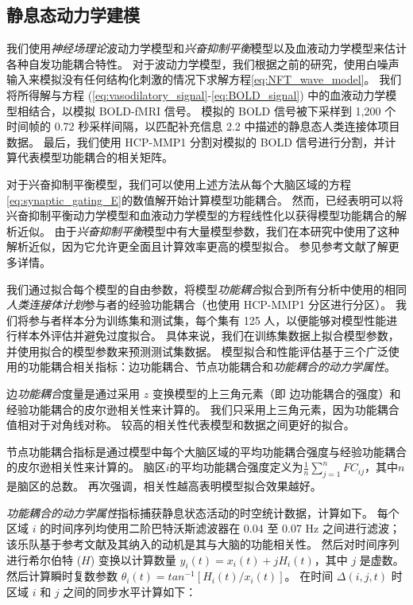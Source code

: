 \documentclass[lang=cn,a4paper,newtx]{elegantpaper}
\begin{document}
\subsection{静息态动力学建模} \label{sec:modelling_resting}

我们使用\textit{神经场理论}波动力学模型和\textit{兴奋抑制平衡}模型以及血液动力学模型来估计各种自发功能耦合特性。
对于波动力学模型，我们根据之前的研究\cite{robinson2005multiscale,sanz2018nftsim}，使用白噪声输入来模拟没有任何结构化刺激的情况下求解方程\ref{eq:NFT_wave_model}。
我们将所得解与方程 (\ref{eq:vasodilatory_signal}-\ref{eq:BOLD_signal}) 中的血液动力学模型相结合，以模拟 BOLD-fMRI 信号。
模拟的 BOLD 信号被下采样到 1,200 个时间帧的 0.72 秒采样间隔，以匹配补充信息 2.2 中描述的静息态人类连接体项目数据。
最后，我们使用 HCP-MMP1 分割对模拟的 BOLD 信号进行分割，并计算代表模型功能耦合的相关矩阵。


对于兴奋抑制平衡模型，我们可以使用上述方法从每个大脑区域的方程\ref{eq:synaptic_gating_E}的数值解开始计算模型功能耦合。
然而，已经表明可以将兴奋抑制平衡动力学模型和血液动力学模型的方程线性化以获得模型功能耦合\cite{demirtacs2019hierarchical}的解析近似。
由于\textit{兴奋抑制平衡}模型中有大量模型参数，我们在本研究中使用了这种解析近似，因为它允许更全面且计算效率更高的模型拟合。
参见参考文献\cite{demirtacs2019hierarchical}了解更多详情。


我们通过拟合每个模型的自由参数，将模型\textit{功能耦合}拟合到所有分析中使用的相同\textit{人类连接体计划}参与者的经验功能耦合（也使用 HCP-MMP1 分区进行分区）。
我们将参与者样本分为训练集和测试集，每个集有 125 人，以便能够对模型性能进行样本外评估并避免过度拟合。
具体来说，我们在训练集数据上拟合模型参数，并使用拟合的模型参数来预测测试集数据。
模型拟合和性能评估基于三个广泛使用的功能耦合相关指标\cite{deco2021dynamical,aquino2022intersection}：边功能耦合、节点功能耦合和\textit{功能耦合的动力学属性}。


边\textit{功能耦合}度量是通过采用 $ z $ 变换模型的上三角元素（即 边功能耦合的强度）和经验功能耦合的皮尔逊相关性来计算的。
我们只采用上三角元素，因为功能耦合值相对于对角线对称。
较高的相关性代表模型和数据之间更好的拟合。


节点功能耦合指标是通过模型中每个大脑区域的平均功能耦合强度与经验功能耦合的皮尔逊相关性来计算的。
脑区$ i $的平均功能耦合强度定义为$ \frac{1}{n} \sum_{j=1}^{n} FC_{ij} $，其中$ n $是脑区的总数。
再次强调，相关性越高表明模型拟合效果越好。


\textit{功能耦合的动力学属性}指标捕获静息状态活动的时空统计数据，计算如下\cite{aquino2022intersection}。
每个区域 $ i $ 的时间序列均使用二阶巴特沃斯滤波器在 0.04 至 0.07 Hz 之间进行滤波；
该乐队基于参考文献\cite{deco2017dynamics}及其纳入的动机是其与大脑的功能相关性\cite{glerean2012functional,pang2019power}。
然后对时间序列进行希尔伯特 ($ H $) 变换以计算数量 $ y_i(t) = x_i(t) + jH_i (t) $，其中 $ j $ 是虚数。
然后计算瞬时复数参数 $ \theta_i(t) = tan^{-1} [H_i(t) / x_i(t)] $。
在时间 $ \Delta(i,j,t) $ 时区域 $ i $ 和 $ j $ 之间的同步水平计算如下：
\end{document}
